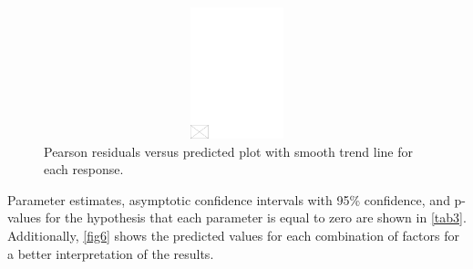 \documentclass[AMA,STIX1COL]{WileyNJD-v2}
\begin{document}
\begin{figure}[h]
\centerline{\includegraphics[width=342pt,height=9pc,draft]{empty}}
\caption{Pearson residuals versus predicted plot with smooth trend line for each response.\label{fig5}}
\end{figure}

Parameter estimates, asymptotic confidence intervals with 95\% confidence, and p-values for the hypothesis that each parameter is equal to zero are shown in \autoref{tab3}. Additionally, \autoref{fig6} shows the predicted values for each combination of factors for a better interpretation of the results.
\end{document}
